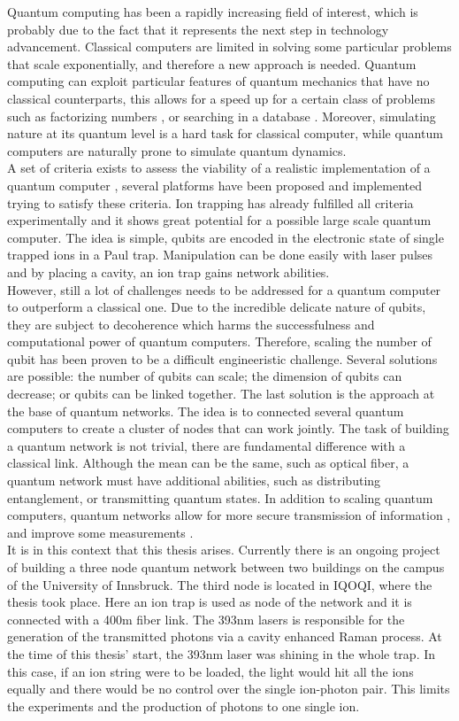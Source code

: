 \documentclass[english, a4paper, 12pt, twoside]{book}
\numberwithin{equation}{section} %
\begin{document}
Quantum computing has been a rapidly increasing field of interest, which is probably due to the fact that it represents the
next step in technology advancement. Classical computers are limited in solving some particular problems that scale exponentially, and therefore a new approach is needed. Quantum computing can exploit particular features of quantum mechanics that have no classical counterparts, this allows for a speed up for a certain class of problems such as factorizing numbers \cite{shor}, or searching in a database \cite{grover}. Moreover, simulating nature at its quantum level is a hard task for classical computer, while quantum computers are naturally prone to simulate quantum dynamics.\\
A set of criteria exists to assess the viability of a realistic implementation of a quantum computer \cite{divincenzo}, several platforms have been proposed and implemented trying to satisfy these criteria. Ion trapping has already fulfilled all criteria experimentally and it shows great potential for a possible large scale quantum computer. The idea is simple, qubits are encoded in the electronic state of single trapped ions in a Paul trap. Manipulation can be done easily with laser pulses and by placing a cavity, an ion trap gains network abilities.\\
However, still a lot of challenges needs to be addressed for a quantum computer to outperform a classical one. Due to the incredible delicate nature of qubits, they are subject to decoherence which harms the successfulness and computational power of quantum computers. Therefore, scaling the number of qubit has been proven to be a difficult engineeristic challenge. Several solutions are possible: the number of qubits can scale; the dimension of qubits can decrease; or qubits can be linked together. The last solution is the approach at the base of quantum networks. The idea is to connected several quantum computers to create a cluster of nodes that can work jointly. The task of building a quantum network is not trivial, there are fundamental difference with a classical link. Although the mean can be the same, such as optical fiber, a quantum network must have additional abilities, such as distributing entanglement, or transmitting quantum states. In addition to scaling quantum computers, quantum networks allow for more secure transmission of information \cite{qkd}, and improve some measurements \cite{quantumclocks}.\\
It is in this context that this thesis arises. Currently there is an ongoing project of building a three node quantum network between two buildings on the campus of the University of Innsbruck. The third node is located in IQOQI, where the thesis took place. Here an ion trap is used as node of the network and it is connected with a 400m fiber link. The 393nm lasers is responsible for the generation of the transmitted photons via a cavity enhanced Raman process. At the time of this thesis' start, the 393nm laser was shining in the whole trap. In this case, if an ion string were to be loaded, the light would hit all the ions equally and there would be no control over the single ion-photon pair. This limits the experiments and the production of photons to one single ion.\\
\end{document}
